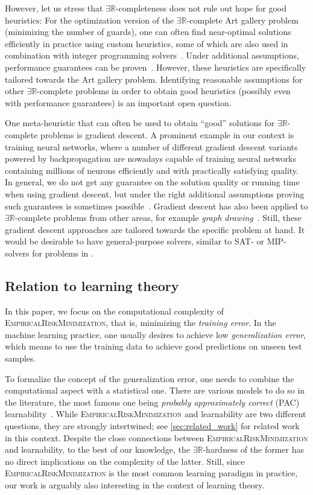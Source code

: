 \documentclass[11pt]{article}
\numberwithin{equation}{section}
\theoremstyle{definition}
\theoremstyle{plain}
\newcommand{\R}{\mathbb R}
\newcommand{\ER}{\texorpdfstring{\ensuremath{\exists\R}}{ER}\xspace}
\newcommand{\problemname}[1]{\textnormal{\textsc{#1}}\xspace}
\newcommand{\ERM}{\problemname{EmpiricalRiskMinimization}}
\renewcommand{\SAT}{\problemname{SAT}}
\renewcommand{\MIP}{\problemname{MIP}}
\theoremstyle{plain}
\begin{document}
However, let us stress that \ER-completeness does not rule out hope for good heuristics:
%
%
%
%
%
%
%
%
%
%
For the optimization version of the \ER-complete Art gallery problem (minimizing the number
of guards),  %
one can often find near-optimal solutions efficiently in practice
using custom heuristics, some of which are also used in combination with integer programming
solvers~\cite{Rezende2016_ArtGalleries}.
Under additional assumptions, performance guarantees can be proven~\cite{Hengeveld2021_ArtGallery}.
However, these heuristics are specifically tailored towards the Art gallery problem.
Identifying reasonable assumptions for other \ER-complete problems in order to obtain
good heuristics (possibly even with performance guarantees) is an important open question.

One meta-heuristic that can %
often be used   %
%
to obtain  %
\enquote{good} solutions for \ER-complete
problems is gradient descent.  
A prominent example in our context is training neural networks, where
%
a number of  %
different gradient descent variants powered by backpropagation are nowadays capable 
of training neural networks containing millions of neurons
%
efficiently and with practically satisfying quality.
%
%
%
%
%
%
%
%
In general, we do not get any guarantee on the solution quality or running time
%
when using gradient descent, but under the right additional assumptions proving such guarantees is sometimes possible~\cite{Brutzkus2017_OptimalGD}.
Gradient descent has also been applied to \ER-complete problems from other areas, for example \emph{graph drawing}~\cite{Ahmed2022_GraphDrawingGD}.
Still, these gradient descent approaches are tailored towards the specific problem at hand.
It would be %
%
desirable to have 
%
general-purpose   %
solvers, similar to \SAT- or \MIP-solvers for problems in \NP.

\subsection{Relation to learning theory}
In this paper, we %
focus on the computational complexity of \ERM, that is, minimizing the \emph{training error}.
In the machine learning practice, one usually desires to achieve low \emph{generalization error}, which means to use the training data to achieve good predictions on unseen test samples.

To formalize the concept of the generalization error, one needs to combine the computational
aspect with a statistical one.
There are various models to do so in the literature, the most famous one being 
\emph{probably approximately correct} (PAC) learnability~\cite{Shalev2014_UnderstandingML,Valiant1984_Theory}.
%
%
%
%
While \ERM and learnability are two different questions, they are strongly intertwined; see \cref{sec:related_work} for related work in this context.
Despite the close connections between \ERM and learnability, to the best of our knowledge, the \ER-hardness of the former has no direct implications on the complexity of the latter.
Still, since \ERM is the most common learning paradigm in practice, our work is arguably also interesting in the context of learning theory.
\end{document}
